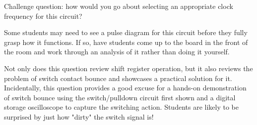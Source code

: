 \vskip 10pt

Challenge question: how would you go about selecting an appropriate clock frequency for this circuit?







Some students may need to see a pulse diagram for this circuit before they fully grasp how it functions.  If so, have students come up to the board in the front of the room and work through an analysis of it rather than doing it yourself.

Not only does this question review shift register operation, but it also reviews the problem of switch contact bounce and showcases a practical solution for it.  Incidentally, this question provides a good excuse for a hands-on demonstration of switch bounce using the switch/pulldown circuit first shown and a digital storage oscilloscope to capture the switching action.  Students are likely to be surprised by just how "dirty" the switch signal is!




